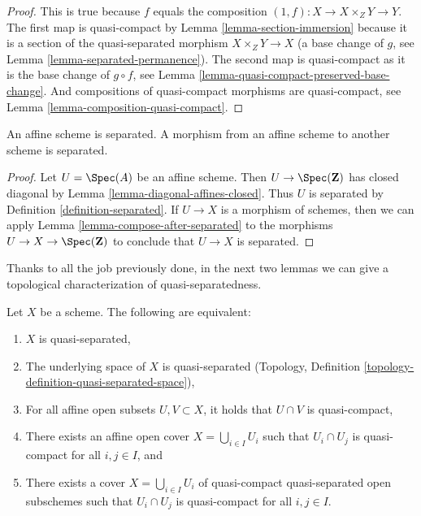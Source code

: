 \begin{proof}
This is true because $f$ equals the composition
$(1, f) : X \to X \times_Z Y \to Y$. The first map
is quasi-compact by Lemma \ref{lemma-section-immersion}
because it is a section of the quasi-separated morphism $X \times_Z Y \to X$
(a base change of $g$, see Lemma \ref{lemma-separated-permanence}).
The second map is quasi-compact as it
is the base change of $g \circ f$, see
Lemma \ref{lemma-quasi-compact-preserved-base-change}.
And compositions of quasi-compact
morphisms are quasi-compact, see Lemma \ref{lemma-composition-quasi-compact}.
\end{proof}

\begin{lemma}
\label{lemma-affine-separated}
An affine scheme is separated. A morphism from an affine scheme
to another scheme is separated.
\end{lemma}

\begin{proof}
Let $U = \Spec(A)$ be an affine scheme. Then $U \to \Spec(\mathbf{Z})$
has closed diagonal by Lemma \ref{lemma-diagonal-affines-closed}.
Thus $U$ is separated by Definition \ref{definition-separated}.
If $U \to X$ is a morphism of schemes, then we can apply
Lemma \ref{lemma-compose-after-separated}
to the morphisms $U \to X \to \Spec(\mathbf{Z})$ to conclude
that $U \to X$ is separated.
\end{proof}

Thanks to all the job previously done, in the next two lemmas
we can give a topological characterization of quasi-separatedness.

\begin{lemma}
	\label{lemma-characterize-quasi-separated-scheme}
	Let $X$ be a scheme. The following are equivalent:
	\begin{enumerate}
		\item $X$ is quasi-separated,
		\item The underlying space of $X$ is quasi-separated
		(Topology, Definition \ref{topology-definition-quasi-separated-space}),
		\item For all affine open subsets $U,V\subset X$, it holds that $U\cap V$ is quasi-compact,
		\item There exists an affine open cover $X=\bigcup_{i\in I} U_i$ such that $U_i\cap U_j$ is quasi-compact for all $i,j\in I$, and
		\item There exists a cover $X=\bigcup_{i\in I}U_i$ of quasi-compact quasi-separated open subschemes such that $U_i\cap U_j$ is quasi-compact for all $i,j\in I$.
	\end{enumerate}
\end{lemma}

